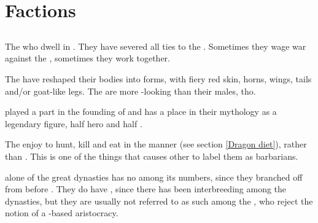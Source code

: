 \chapter{Factions}
\section{\Baelzerach}
\label{\Baelzerach}
The \daemonic{} \resphain{} who dwell in \Machai{}. 
They have severed all ties to the \banes. 
Sometimes they wage war against the \dragons, sometimes they work together. 

The \Baelzerach{} have reshaped their bodies into \daemonic{} forms, with fiery red skin, horns, wings, tails and/or goat-like legs. 
The \resphanesses{} are more \human-looking than their males, tho. 

\Ishna{} played a part in the founding of \Baelzerach{} and has a place in their mythology as a legendary figure, half hero and half \devil. 

The \Baelzerach{} enjoy to hunt, kill and eat in the \draconic{} manner (see section \ref{Dragon diet}), rather than . 
This is one of the things that causes other \resphain{} to label them as barbarians. 

\Baelzerach{} alone of the great dynasties has no \satharioth{} among its numbers, since they branched off from \KiriathSepher{} before . 
They do have \ketherain, since there has been interbreeding among the dynasties, but they are usually not referred to as such among the \Baelzerach, who reject the notion of a \KiriathSepher{}-based aristocracy. 















\section{\Banes}
\label{Bane}
\label{Banes}
% 







